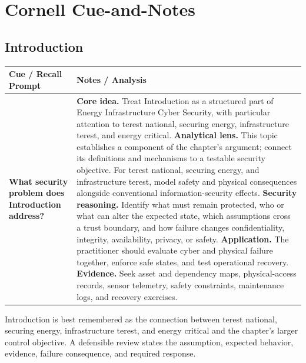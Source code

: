 \documentclass[11pt]{article}
\newcommand{\CornellHeader}{%
\rowcolor{Navy}\color{white}\bfseries Cue / Recall Prompt & \color{white}\bfseries Notes / Analysis\\\hline}
\newcommand{\CornellRow}[2]{%
\cellcolor{CueGray}\RaggedRight\textbf{#1} & \RaggedRight #2\\\hline}
\begin{document}
\section*{Cornell Cue-and-Notes}
\subsection*{Introduction}
\begin{longtable}{>{\RaggedRight\arraybackslash}p{}|>{\RaggedRight\arraybackslash}p{}}
\CornellHeader
\CornellRow{What security problem does Introduction address?}{\textbf{Core idea.} Treat Introduction as a structured part of Energy Infrastructure Cyber Security, with particular attention to terest national, securing energy, infrastructure terest, and energy critical. \textbf{Analytical lens.} This topic establishes a component of the chapter's argument; connect its definitions and mechanisms to a testable security objective. For terest national, securing energy, and infrastructure terest, model safety and physical consequences alongside conventional information-security effects. \textbf{Security reasoning.} Identify what must remain protected, who or what can alter the expected state, which assumptions cross a trust boundary, and how failure changes confidentiality, integrity, availability, privacy, or safety. \textbf{Application.} The practitioner should evaluate cyber and physical failure together, enforce safe states, and test operational recovery. \textbf{Evidence.} Seek asset and dependency maps, physical-access records, sensor telemetry, safety constraints, maintenance logs, and recovery exercises.}
\end{longtable}
\begin{topicsummary}
Introduction is best remembered as the connection between terest national, securing energy, infrastructure terest, and energy critical and the chapter's larger control objective. A defensible review states the assumption, expected behavior, evidence, failure consequence, and required response.
\end{topicsummary}
\end{document}

